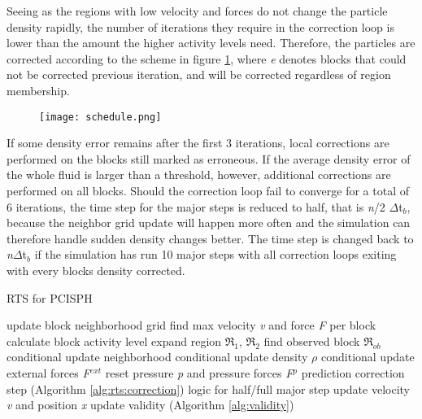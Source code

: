 \documentclass[../../main.tex]{subfiles}
\begin{document}
Seeing as the regions with low velocity and forces do not change the particle density rapidly, the number of iterations they require in the correction loop is lower than the amount the higher activity levels need. Therefore, the particles are corrected according to the scheme in figure \ref{fig:schedule}, where \textit{e} denotes blocks that could not be corrected previous iteration, and will be corrected regardless of region membership. 

\begin{figure}[h!]
    \centering
    \texttt{[image: schedule.png]}
    \caption[Correction scheme for RTS]{ }
    \label{fig:schedule}
\end{figure}

If some density error remains after the first 3 iterations, local corrections are performed on the blocks still marked as erroneous. If the average density error of the whole fluid is larger than a threshold, however, additional corrections are performed on all blocks. Should the correction loop fail to converge for a total of 6 iterations, the time step for the major steps is reduced to half, that is \textit{n}/2 $\Delta$t$_b$, because the neighbor grid update will happen more often and the simulation can therefore handle sudden density changes better. The time step is changed back to \textit{n}$\Delta$t$_b$ if the simulation has run 10 major steps with all correction loops exiting with every blocks density corrected. 


\begin{algorithm}[]
    \caption{RTS for PCISPH}
    \label{alg:rts:pcisph}
    \begin{algorithmic}[1]
            \State update block neighborhood grid
            \State find max velocity \textit{v} and force \textit{F} per block
            \State calculate block activity level
            \State expand region $\Re_1$, $\Re_2$
            \State find observed block $\Re_{ob}$
                \State conditional update neighborhood
                \State conditional update density $\rho$
                \State conditional update external forces \textit{F}$^{ext}$
                \State reset pressure \textit{p} and pressure forces \textit{F}$^p$
                \State prediction correction step (Algorithm \ref{alg:rts:correction})
                \State logic for half/full major step
                \State update velocity \textit{v} and position \textit{x}
                \State update validity (Algorithm \ref{alg:validity})
            \EndFor
        \EndWhile
   \end{algorithmic}
\end{algorithm}
\end{document}
